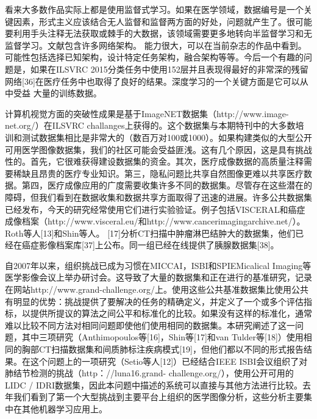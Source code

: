 看来大多数作品实际上都是使用监督式学习。如果在医学领域，数据编号是一个关键因素，形式主义应该结合无人监督和监督两方面的好处，问题就产生了。很可能要利用手头注释无法获取或棘手的大数据，该领域需要更多地转向半监督学习和无监督学习。文献包含许多网络架构。 能力很大，可以在当前杂志的作品中看到。可能性包括选择已知架构，设计特定任务架构，融合架构等等。今后一个有趣的问题是，如果在ILSVRC 2015分类任务中使用152层并且表现得最好的非常深的残留网络[36]在医疗任务中也取得了良好的结果。深度学习的一个关键方面是它可以从中受益
大量的训练数据。

计算机视觉方面的突破性成果是基于ImageNET数据集（http://www.image-net.org/）在ILSVRC challanges上获得的。这个数据集与本期特刊中的大多数培训和测试数据集相比是非常大的（数百万对100或1000）。如果构建类似的大型公开可用医学图像数据集，我们的社区可能会受益匪浅。这有几个原因，这是具有挑战性的。首先，它很难获得建设数据集的资金。其次，医疗成像数据的高质量注释需要稀缺且昂贵的医疗专业知识。第三，隐私问题比共享自然图像更难以共享医疗数据。第四，医疗成像应用的广度需要收集许多不同的数据集。尽管存在这些潜在的障碍，但我们看到在数据收集和数据共享方面取得了迅速的进展。许多公共数据集已经发布，今天的研究经常使用它们进行实验验证。例子包括VISCERAL和癌症成像档案（http://www.visceral.eu/和http://www.cancerimagingarchive.net/）。 Roth等人[13]和Shin等人。 [17]分析CT扫描中肿瘤淋巴结肿大的数据集，他们已经在癌症影像档案库[37]上公布。同一组已经在线提供了胰腺数据集[38]。

自2007年以来，组织挑战已成为习惯在MICCAI，ISBI和SPIEMicalical Imaging等医学影像会议上举办研讨会。这导致了大量的数据集和正在进行的基准研究，记录在网站http://www.grand-challenge.org/上。使用这些公共基准数据集比使用公共有明显的优势：挑战提供了要解决的任务的精确定义，并定义了一个或多个评估指标，以提供所提议的算法之间公平和标准化的比较。如果没有这样的标准化，通常难以比较不同方法对相同问题即使他们使用相同的数据集。本研究阐述了这一问题，其中三项研究（Anthimopoulos等[16]，Shin等[17]和van Tulder等[18]）使用相同的胸部CT扫描数据集和间质肺标注疾病模式[19]，但他们都以不同的形式报告结果。在这个问题上的一项研究（Setio等人[12]）已经结合IEEE ISBI会议组织了对肺结节检测的挑战（http：//luna16.grand- challenge.org/），使用公开可用的LIDC / IDRI数据集，因此本问题中描述的系统可以直接与其他方法进行比较。去年我们看到了第一个大型挑战到主要平台上组织的医学图像分析，这些分析主要集中在其他机器学习应用上。 


